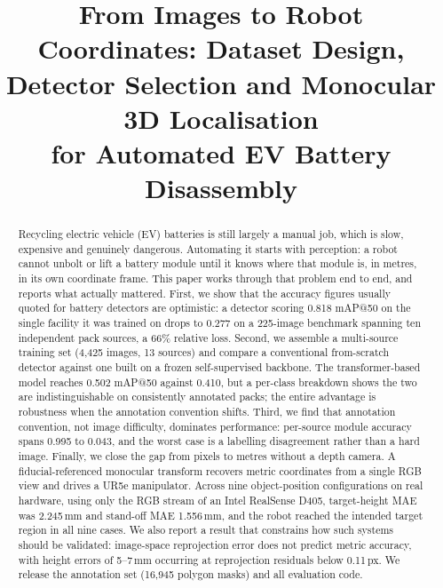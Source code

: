 \documentclass[conference]{IEEEtran}
\begin{document}
\title{From Images to Robot Coordinates: Dataset Design,\\Detector Selection and Monocular 3D Localisation\\for Automated EV Battery Disassembly}

\author{
}

\maketitle

\begin{abstract}
Recycling electric vehicle (EV) batteries is still largely a manual job, which is
slow, expensive and genuinely dangerous. Automating it starts with perception: a
robot cannot unbolt or lift a battery module until it knows where that module is, in
metres, in its own coordinate frame. This paper works through that problem end to
end, and reports what actually mattered. First, we show that the accuracy figures
usually quoted for battery detectors are optimistic: a detector scoring 0.818 mAP@50
on the single facility it was trained on drops to 0.277 on a 225-image benchmark
spanning ten independent pack sources, a 66\% relative loss. Second, we assemble a
multi-source training set (4,425 images, 13 sources) and compare a conventional
from-scratch detector against one built on a frozen self-supervised backbone. The
transformer-based model reaches 0.502 mAP@50 against 0.410, but a per-class
breakdown shows the two are indistinguishable on consistently annotated packs; the
entire advantage is robustness when the annotation convention shifts. Third, we find
that annotation convention, not image difficulty, dominates performance: per-source
module accuracy spans 0.995 to 0.043, and the worst case is a labelling disagreement
rather than a hard image. Finally, we close the gap from pixels to metres without a
depth camera. A fiducial-referenced monocular transform recovers metric coordinates
from a single RGB view and drives a UR5e manipulator. Across nine object-position
configurations on real hardware, using only the RGB stream of an Intel RealSense
D405, target-height MAE was 2.245\,mm and stand-off MAE 1.556\,mm, and the robot
reached the intended target region in all nine cases. We also report a result that
constrains how such systems should be validated: image-space reprojection error does
not predict metric accuracy, with height errors of 5--7\,mm occurring at reprojection
residuals below 0.11\,px. We release the annotation set (16,945 polygon masks) and
all evaluation code.
\end{abstract}
\end{document}
